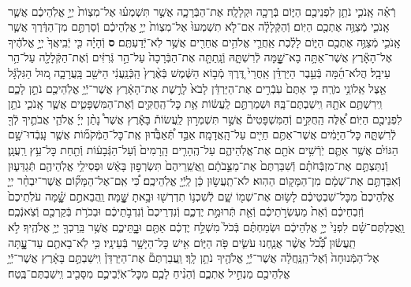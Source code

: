 \documentclass[twoside, openany, parskip=half, 11pt]{book}
\begin{document}
\begin{footnotesize}
\begin{multicols}{2}
\\
רְֿאֵ֗ה אָֽנֹכִ֛י נֹתֵ֥ן לִפְנֵיכֶ֖ם הַיּ֑וֹם בְּֿרָכָ֖ה וּקְלָלָֽה׃ אֶת־הַבְּֿרָכָ֑ה אֲשֶׁ֣ר תִּשְׁמְע֗וּ אֶל־מִצְוֹת֙ יְיָ֣ אֱלֹֽהֵיכֶ֔ם אֲשֶׁ֧ר אָֽנֹכִ֛י מְֿצַוֶּ֥ה אֶתְכֶ֖ם הַיּֽוֹם׃ וְֿהַקְּֿלָלָ֗ה אִם־לֹ֤א תִשְׁמְעוּ֙ אֶל־מִצְוֹת֙ יְיָ֣ אֱלֹֽהֵיכֶ֔ם וְֿסַרְתֶּ֣ם מִן־הַדֶּ֔רֶךְ אֲשֶׁ֧ר אָֽנֹכִ֛י מְֿצַוֶּ֥ה אֶתְכֶ֖ם הַיּ֑וֹם לָלֶ֗כֶת אַֽחֲרֵ֛י אֱלֹהִ֥ים אֲחֵרִ֖ים אֲשֶׁ֥ר לֹֽא־יְֿדַעְתֶּֽם׃ \textbf{ס} וְֿהָיָ֗ה כִּ֤י יְֿבִֽיאֲךָ֙ יְיָ֣ אֱלֹהֶ֔יךָ אֶל־הָאָ֕רֶץ אֲשֶׁר־אַתָּ֥ה בָא־שׇׇׇָׁ֖מָּה לְֿרִשְׁתָּ֑הּ וְֿנָֽתַתָּ֤ה אֶת־הַבְּֿרָכָה֙ עַל־הַ֣ר גְּֿרִזִּ֔ים וְֿאֶת־הַקְּֿלָלָ֖ה עַל־הַ֥ר עֵיבָֽל׃ הֲלֹא־הֵ֜מָּה בְּֿעֵ֣בֶר הַיַּרְדֵּ֗ן אַֽחֲרֵי֙ דֶּ֚רֶךְ מְֿב֣וֹא הַשֶּׁ֔מֶשׁ בְּֿאֶ֨רֶץ֙ הַֽכְּֿנַֽעֲנִ֔י הַיּשֵׁ֖ב בָּֽעֲרָבָ֑ה מ֚וּל הַגִּלְגָּ֔ל אֵ֖צֶל אֵֽלוֹנֵ֥י מֹרֶֽה׃ כִּ֤י אַתֶּם֙ עֹֽבְֿרִ֣ים אֶת־הַיַּרְדֵּ֔ן לָבֹא֙ לָרֶ֣שֶׁת אֶת־הָאָ֔רֶץ אֲשֶׁר־יְֿיָ֥ אֱלֹֽהֵיכֶ֖ם נֹתֵ֣ן לָכֶ֑ם וִֽירִשְׁתֶּ֥ם אֹתָ֖הּ וִֽישַׁבְתֶּם־בָּֽהּ׃
וּשְׁמַרְתֶּ֣ם לַֽעֲשׂ֔וֹת אֵ֥ת כׇּל־הַֽחֻקִּ֖ים וְֿאֶת־הַמִּשְׁפָּטִ֑ים אֲשֶׁ֧ר אָֽנֹכִ֛י נֹתֵ֥ן לִפְנֵיכֶ֖ם הַיּֽוֹם׃
אֵ֠לֶּה הַֽחֻקִּ֣ים וְֿהַמִּשְׁפָּטִים֘ אֲשֶׁ֣ר תִּשְׁמְר֣וּן לַֽעֲשׂוֹת֒ בָּאָ֕רֶץ אֲשֶׁר֩ נָתַ֨ן יְיָ֜ אֱלֹהֵ֧י אֲבֹתֶ֛יךָ לְֿךָ֖ לְֿרִשְׁתָּ֑הּ כׇּל־הַיָּמִ֔ים אֲשֶׁר־אַתֶּ֥ם חַיִּ֖ים עַל־הָֽאֲדָמָֽה׃ אַבֵּ֣ד תְּֿ֠אַבְּֿד֠וּן אֶֽת־כׇּל־הַמְּֿקֹמ֞וֹת אֲשֶׁ֧ר עָֽבְֿדוּ־שָׁ֣ם הַגּוֹיִ֗ם אֲשֶׁ֥ר אַתֶּ֛ם יֹֽרְֿשִׁ֥ים אֹתָ֖ם אֶת־אֱלֹֽהֵיהֶ֑ם עַל־הֶֽהָרִ֤ים הָֽרָמִים֙ וְֿעַל־הַגְּֿבָע֔וֹת וְֿתַ֖חַת כׇּל־עֵ֥ץ רַֽעֲנָֽן׃ וְֿנִתַּצְתֶּ֣ם אֶת־מִזְבְּֿחֹתָ֗ם וְֿשִׁבַּרְתֶּם֙ אֶת־מַצֵּ֣בֹתָ֔ם וַֽאֲשֵֽׁרֵיהֶם֙ תִּשְׂרְפ֣וּן בָּאֵ֔שׁ וּפְסִילֵ֥י אֱלֹֽהֵיהֶ֖ם תְּֿגַדֵּע֑וּן וְֿאִבַּדְתֶּ֣ם אֶת־שְׁמָ֔ם מִן־הַמָּק֖וֹם הַהֽוּא׃ לֹא־תַֽעֲשׂ֣וּן כֵּ֔ן לַֽיְֿיָ֖ אֱלֹֽהֵיכֶֽם׃ כִּ֠י אִֽם־אֶל־הַמָּק֞וֹם אֲשֶׁר־יִבְחַ֨ר יְיָ֤ אֱלֹֽהֵיכֶם֙ מִכׇּל־שִׁבְטֵיכֶ֔ם לָשׂ֥וּם אֶת־שְׁמ֖וֹ שָׁ֑ם לְֿשִׁכְנ֥וֹ תִדְרְשׁ֖וּ וּבָ֥אתָ שׇׇׇׇָּֽׁמָּה׃  וַֽהֲבֵאתֶ֣ם שׇׇׇָׁ֗מָּה עֹלֹֽתֵיכֶם֙ וְֿזִבְחֵיכֶ֔ם וְֿאֵת֙ מַעְשְׂרֹ֣תֵיכֶ֔ם וְֿאֵ֖ת תְּֿרוּמַ֣ת יֶדְכֶ֑ם וְֿנִדְרֵיכֶם֙ וְֿנִדְבֹ֣תֵיכֶ֔ם וּבְכֹרֹ֥ת בְּֿקַרְכֶ֖ם וְֿצֹֽאנְֿכֶֽם׃ וַֽאֲכַלְתֶּם־שָׁ֗ם לִפְנֵי֙ יְיָ֣ אֱלֹֽהֵיכֶ֔ם וּשְׂמַחְתֶּ֗ם בְּֿכֹל֙ מִשְׁלַ֣ח יֶדְכֶ֔ם אַתֶּ֖ם וּבׇׇׇׇׇׇׇָֽתֵּיכֶ֑ם אֲשֶׁ֥ר בֵּֽרַכְךָ֖ יְיָ֥ אֱלֹהֶֽיךָ׃ לֹ֣א תַֽעֲשׂ֔וּן כְּֿ֠כֹ֠ל אֲשֶׁ֨ר אֲנַ֧חְנוּ עֹשִׂ֛ים פֹּ֖ה הַיּ֑וֹם אִ֖ישׁ כׇּל־הַיָּשָׁ֥ר בְּֿעֵינָֽיו׃ כִּ֥י לֹֽא־בָאתֶ֖ם עַד־עׇׇׇָ֑תָּה אֶל־הַמְּֿנוּחָה֙ וְֿאֶל־הַֽנַּֽחֲלָ֔ה אֲשֶׁר־יְֿיָ֥ אֱלֹהֶ֖יךָ נֹתֵ֥ן לָֽךְ׃ וַֽעֲבַרְתֶּם֘ אֶת־הַיַּרְדֵּן֒ וִֽישַׁבְתֶּ֣ם בָּאָ֔רֶץ אֲשֶׁר־יְֿיָ֥ אֱלֹֽהֵיכֶ֖ם מַנְחִ֣יל אֶתְכֶ֑ם וְֿהֵנִ֨יחַ לָכֶ֧ם מִכׇּל־אֹֽיְֿבֵיכֶ֛ם מִסָּבִ֖יב וִֽישַׁבְתֶּם־בֶּֽטַח׃


\end{multicols}
\end{footnotesize}
\end{document}
